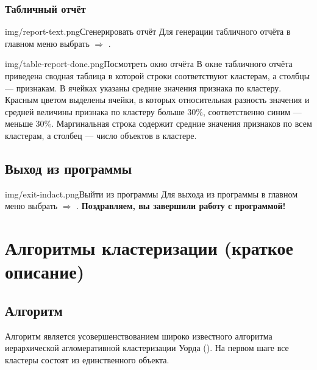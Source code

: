 \documentclass[12pt,tikz]{instruction}
\begin{document}
\newpage
\subsubsection{Табличный отчёт}

\begin{steps}
	\begin{ist}{img/report-text.png}{Сгенерировать отчёт}
		Для генерации табличного отчёта в главном меню выбрать  $\Rightarrow$ .
	\end{ist}
	\begin{ist}{img/table-report-done.png}{Посмотреть окно отчёта}
		В окне табличного отчёта приведена сводная таблица в которой строки соответствуют кластерам, а столбцы --- признакам. В ячейках указаны средние значения признака по кластеру. Красным цветом выделены ячейки, в которых относительная разность значения и средней величины признака по кластеру больше 30\%, соответственно синим --- меньше 30\%. Маргинальная строка содержит средние значения признаков по всем кластерам, а столбец --- число объектов в кластере.
	\end{ist}
	
\end{steps}


\newpage
\subsection{Выход из программы}

\begin{steps}
	\begin{ist}{img/exit-indact.png}{Выйти из программы}
			Для выхода из программы в главном меню выбрать  $\Rightarrow$ . \textbf{Поздравляем, вы завершили работу с программой!}
	\end{ist}
\end{steps}

\section{Алгоритмы кластеризации (краткое описание)}
\label{sec:algs}
\subsection{Алгоритм  \AWard}
\label{subsec:a-ward}
Алгоритм \AWard является усовершенствованием  широко известного алгоритма иерархической агломеративной кластеризации Уорда (\Ward)\cite{ward}. На первом шаге все кластеры состоят из единственного объекта. 
\end{document}
